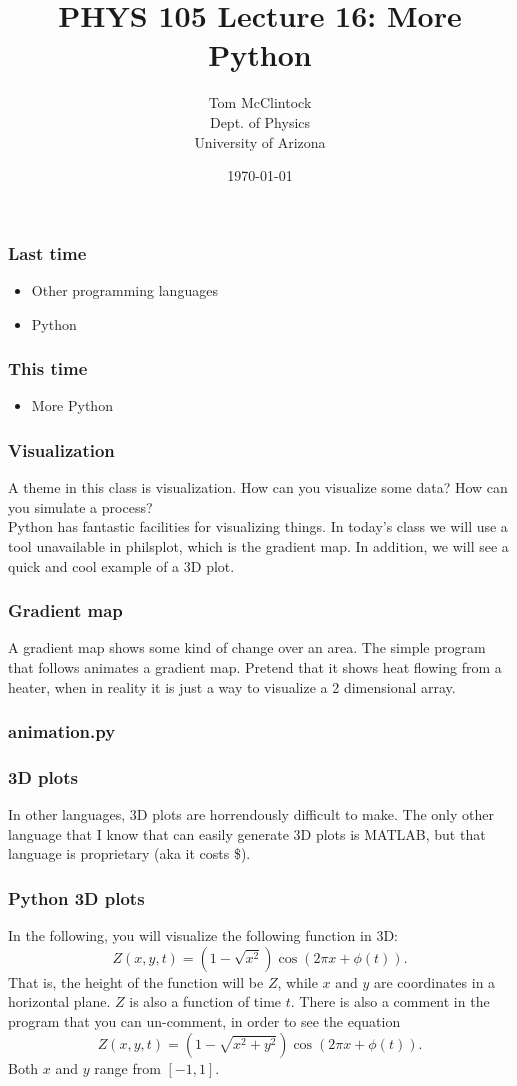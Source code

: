 \documentclass{beamer}
\title{PHYS 105 Lecture 16: More Python}
\author{Tom McClintock \\
	Dept. of Physics\\
	University of Arizona
}
\date{\today}
\begin{document}
\begin{frame}
  \titlepage
\end{frame}

\begin{frame}
  \frametitle{Last time}
  \begin{itemize}
  \item Other programming languages
  \item Python
  \end{itemize}
\end{frame}

\begin{frame}
  \frametitle{This time}
  \begin{itemize}
  \item More Python
  \end{itemize}
\end{frame}

\begin{frame}
  \frametitle{Visualization}
  A theme in this class is visualization. How can you visualize some data?
  How can you simulate a process?\\
  Python has fantastic facilities for visualizing things. In today's class
  we will use a tool unavailable in philsplot, which is the gradient map.
  In addition, we will see a quick and cool example of a 3D plot.
\end{frame}

\begin{frame}
  \frametitle{Gradient map}
  A gradient map shows some kind of change over an area. The simple program
  that follows animates a gradient map. Pretend that it shows heat flowing
  from a heater, when in reality it is just a way to visualize a 2 dimensional
  array.
\end{frame}

\begin{frame}
  \frametitle{animation.py}
  
\end{frame}

\begin{frame}
  \frametitle{3D plots}
  In other languages, 3D plots are horrendously difficult to make.
  The only other language that I know that can easily generate 3D plots
  is MATLAB, but that language is proprietary (aka it costs \$).
\end{frame}
\begin{frame}
  \frametitle{Python 3D plots}
  In the following, you will visualize the following function in 3D:
  \begin{equation*}
    Z(x,y,t) = \left(1-\sqrt{x^2}\right)\cos(2\pi x+\phi(t)).
  \end{equation*}
  That is, the height of the function will be $Z$, while $x$ and $y$ are coordinates
  in a horizontal plane. $Z$ is also a function of time $t$. There is also
  a comment in the program that you can un-comment, in order to see the
  equation
  \begin{equation*}
    Z(x,y,t) = \left(1-\sqrt{x^2+y^2}\right)\cos(2\pi x+\phi(t)).
  \end{equation*}
  Both $x$ and $y$ range from $[-1,1]$.
\end{frame}
\end{document}
